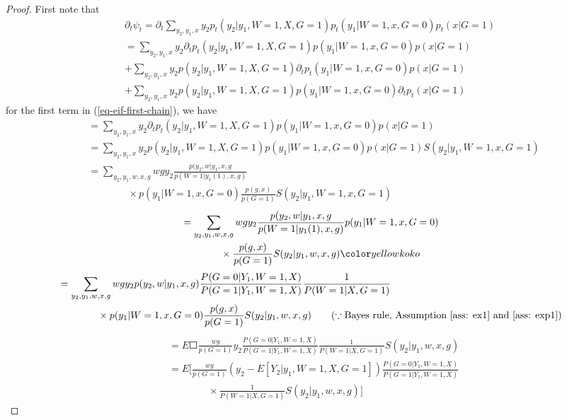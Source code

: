 \documentclass[uplatex,dvipdfmx]{jsarticle}
\begin{document}
\begin{proof}
    First note that 
    \begin{align}\label{eq-eif-first-chain}
        \partial_t \psi_t = \partial_t \sum_ { y_2, y_1,x} y_2 p_t ( y_2| y_1 , W= 1, X , G= 1) p_t ( y_1 | W =1 , x, G= 0 ) p_t( x | G =1 )   \\
        = \sum_ { y_2 ,y_1,x} y_2 \partial_t p_t ( y_2| y_1 , W= 1, X , G= 1) p ( y_1 | W =1 , x, G= 0 ) p( x | G =1 )   \\
        + \sum_ { y_2 ,y_1,x} y_2  p ( y_2| y_1 , W= 1, X , G= 1)\partial_t p_t ( y_1 | W =1 , x, G= 0 ) p( x | G =1 ) \\
        + \sum_ { y_2 ,y_1,x} y_2  p ( y_2| y_1 , W= 1, X , G= 1) p ( y_1 | W =1 , x, G= 0 ) \partial_t p_t( x | G =1 )
    \end{align}
    for the first term in (\ref{eq-eif-first-chain}),  we have
    \begin{align*}
        &=\sum_ { y_2 ,y_1,x} y_2 \partial_t p_t ( y_2| y_1 , W= 1, X , G= 1) p ( y_1 | W =1 , x, G= 0 ) p( x | G =1 ) \\
        &= \sum_ { y_2 ,y_1,x} y_2 p ( y_2| y_1 , W= 1, X , G= 1) p ( y_1 | W =1 , x, G= 0 ) p( x | G =1 ) S ( y_2| y_1 , W= 1, x , G= 1) \\
        &= \sum_ { y_2 ,y_1,w, x, g}  w g  y_2  \frac{ p( y_2, w | y_1, x, g}{ p ( W = 1 | y_1(1) , x , g ) }\\
        &\qquad\qquad\times p ( y_1 | W =1 , x, G= 0 ) \frac{ p ( g, x ) } { p(G =1)} S ( y_2| y_1 , W= 1, x , G= 1)
    \end{align*}
    \begin{align*}
        &= \sum_ { y_2 ,y_1,w, x, g}   w g  y_2  \frac{ p( y_2, w | y_1, x, g}{ p ( W = 1 | y_1(1) , x , g ) }   p ( y_1 | W =1 , x, G= 0 ) \\
        &\qquad\qquad\times\frac{ p ( g, x ) } { p(G =1)} S ( y_2| y_1 , w, x , g) \koko
    \end{align*}
    \begin{align*}
        &= \sum_{ y_2 ,y_1,w, x, g}  w g   y_2   p( y_2, w | y_1, x, g)  \frac{ P( G =0 | Y_1 , W=1 , X ) }{ P(G=1 | Y_1 , W=1 , X ) } \frac{1}{P( W=1 | X , G=1)}   \\
        &\qquad\qquad\times p ( y_1 | W =1 , x, G= 0 ) 
        \frac{ p ( g, x ) }{ p(G =1)} S ( y_2| y_1 , w, x , g) \qquad( \because\text{Bayes rule, Assumption \ref{ass: ex1} and \ref{ass: exp1}})
    \end{align*}
    \begin{align*}
        &= E \Square{  \frac{ w g }{ p (G = 1) } y_2     \frac{ P( G =0 | Y_1 , W=1 , X ) }{ P(G=1 | Y_1 , W=1 , X ) }\frac{1}{P( W=1 | X , G=1)}    S ( y_2| y_1 , w, x , g)}\\
        &= E \biggl[  \frac{ w g }{ p (G = 1) } ( y_2 - E [ Y_2 | y_1 , W = 1, X, G =1 ] )     \frac{ P( G =0 | Y_1 , W=1 , X ) }{ P(G=1 | Y_1 , W=1 , X ) }\\
        &\qquad\qquad\times \frac{1}{P( W=1 | X , G=1)}    S ( y_2| y_1 , w, x , g) \biggr]
    \end{align*}


\end{proof}
\end{document}
